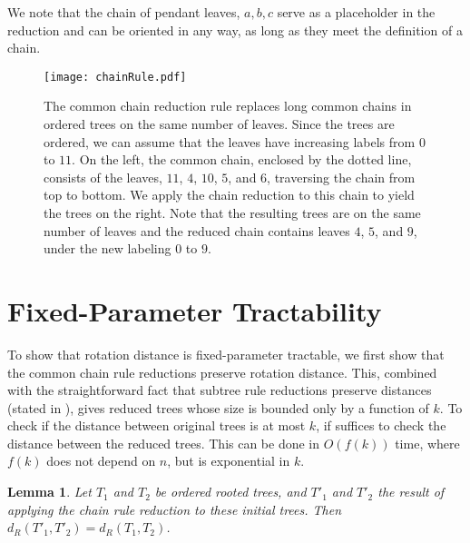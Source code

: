 \documentclass[12pt]{article}
\newtheorem{lemma}[theorem]{Lemma}
\begin{document}
We note that the chain of pendant leaves, $a,b,c$ serve as a placeholder in the 
reduction and can be oriented in any way, as long as they meet the definition of
a chain.

\begin{figure}
\begin{center}
\texttt{[image: chainRule.pdf]}
\end{center}
\caption{\small The common chain reduction rule replaces long common chains in ordered trees on 
the same number of leaves.  Since the trees are ordered, we can assume that the leaves have
increasing labels from $0$ to $11$.  On the left, the common chain, enclosed by the dotted line, 
consists of the leaves, $11$, $4$, $10$, $5$, and $6$, traversing the chain from top to bottom.
We apply the chain reduction to this chain to yield the trees on the right.  Note that the resulting
trees are on the same number of leaves and the reduced chain contains leaves $4$, $5$, and
$9$, under the new labeling  $0$ to $9$. }
\label{chainRuleFigure}

\end{figure}

\section{Fixed-Parameter Tractability}

To show that rotation distance is fixed-parameter 
tractable, we first show that the common chain rule reductions
preserve rotation distance.  
This, combined with the
straightforward fact that subtree rule reductions preserve
distances (stated in \cite{stt}), gives reduced trees whose size is bounded
only by a function of $k$.   To check if the distance between
original trees is at most $k$, if suffices to check the distance
between the reduced trees. This can be
done in $O(f(k))$ time, where $f(k)$ does not 
depend on $n$, but is exponential in $k$. 

\begin{lemma} 
\label{lemchain} Let $T_1$ and $T_2$ be ordered rooted
trees, and $T'_1$ and $T'_2$ the result of applying the chain
rule reduction to these initial trees.  Then
$d_R(T'_1,T'_2) = d_R(T_1,T_2)$.
\end{lemma}
\end{document}

